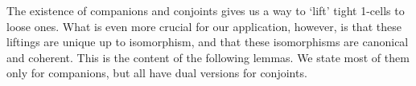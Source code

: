 
The existence of companions and conjoints gives us a way to `lift'
tight 1-cells to loose ones.  What is even more crucial
for our application, however, is that these liftings are unique up to
isomorphism, and that these isomorphisms are canonical and coherent.
This is the content of the following lemmas.  We state most of them
only for companions, but all have dual versions for conjoints.


